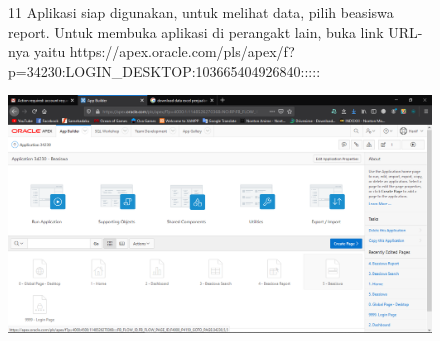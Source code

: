 \begin{enumerate}
\begin{figure}[!htbp]
\item[11] Aplikasi siap digunakan, untuk melihat data, pilih beasiswa report. Untuk membuka aplikasi di perangakt lain, buka link URL-nya yaitu
 https://apex.oracle.com/pls/apex/f?p=34230:LOGIN\_DESKTOP:103665404926840:::::
\begin{center}
    \includegraphics[scale=0.3]{section/Screenshot(36).png}
    \end{center}
    \end{figure}    
\end{enumerate}


